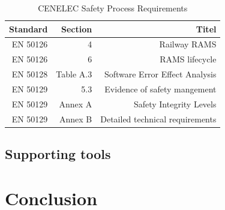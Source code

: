 \documentclass{template/openetcs_article}
\begin{document}
\begin{table}[htbp]
  \centering
  \caption{CENELEC Safety Process Requirements}
    \begin{tabular}{r|r|r}
    Standard & Section & Titel \\
    \hline
     EN 50126 & 4 & Railway RAMS  \\ 
    EN 50126 & 6 & RAMS lifecycle \\
     EN 50128 & Table A.3 & Software Error Effect Analysis\\
    EN 50129 & 5.3 & Evidence of safety mangement \\
    EN 50129 & Annex A & Safety Integrity Levels \\
    EN 50129 & Annex B & Detailed technical requirements \\
    \end{tabular}%
  \label{tab:Safety Process Requirements}%
\end{table}%

\subsection{Supporting tools}



\section{Conclusion}

\nocite{*}






\begin{thebibliography}{9}



\end{thebibliography}

\end{document}
